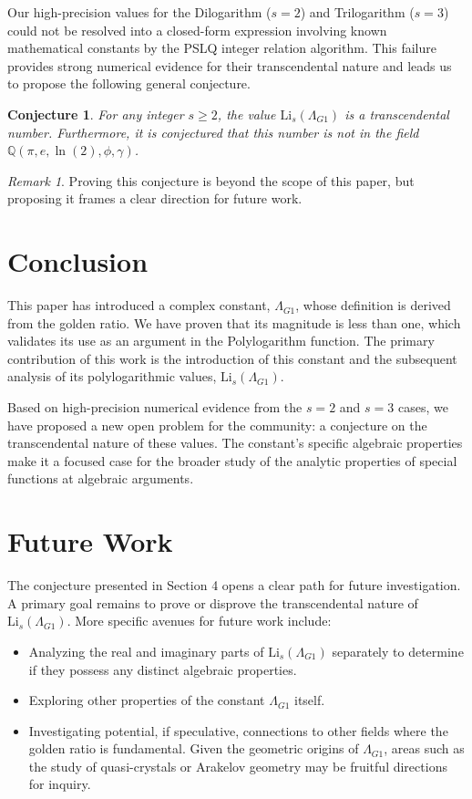 \documentclass{amsart}
\theoremstyle{plain}
\newtheorem{conjecture}[theorem]{Conjecture}
\theoremstyle{definition}
\theoremstyle{remark}
\newtheorem*{remark}{Remark}
\newcommand{\LambdaG}{\Lambda_{G1}}
\begin{document}
Our high-precision values for the Dilogarithm ($s=2$) and Trilogarithm ($s=3$) could not be resolved into a closed-form expression involving known mathematical constants by the PSLQ integer relation algorithm. This failure provides strong numerical evidence for their transcendental nature and leads us to propose the following general conjecture.

\begin{conjecture}
For any integer $s \ge 2$, the value $\mathrm{Li}_s(\LambdaG)$ is a transcendental number. Furthermore, it is conjectured that this number is not in the field $\mathbb{Q}(\pi, e, \ln(2), \phi, \gamma)$.
\end{conjecture}
\begin{remark}
Proving this conjecture is beyond the scope of this paper, but proposing it frames a clear direction for future work.
\end{remark}

\section{Conclusion}
This paper has introduced a complex constant, $\LambdaG$, whose definition is derived from the golden ratio. We have proven that its magnitude is less than one, which validates its use as an argument in the Polylogarithm function. The primary contribution of this work is the introduction of this constant and the subsequent analysis of its polylogarithmic values, $\mathrm{Li}_s(\LambdaG)$.

Based on high-precision numerical evidence from the $s=2$ and $s=3$ cases, we have proposed a new open problem for the community: a conjecture on the transcendental nature of these values. The constant's specific algebraic properties make it a focused case for the broader study of the analytic properties of special functions at algebraic arguments.

\section{Future Work}
The conjecture presented in Section 4 opens a clear path for future investigation. A primary goal remains to prove or disprove the transcendental nature of $\mathrm{Li}_s(\LambdaG)$. More specific avenues for future work include:
\begin{itemize}
    \item Analyzing the real and imaginary parts of $\mathrm{Li}_s(\LambdaG)$ separately to determine if they possess any distinct algebraic properties.
    \item Exploring other properties of the constant $\LambdaG$ itself.
    \item Investigating potential, if speculative, connections to other fields where the golden ratio is fundamental. Given the geometric origins of $\Lambda_{G1}$, areas such as the study of quasi-crystals or Arakelov geometry may be fruitful directions for inquiry.
\end{itemize}
\end{document}
